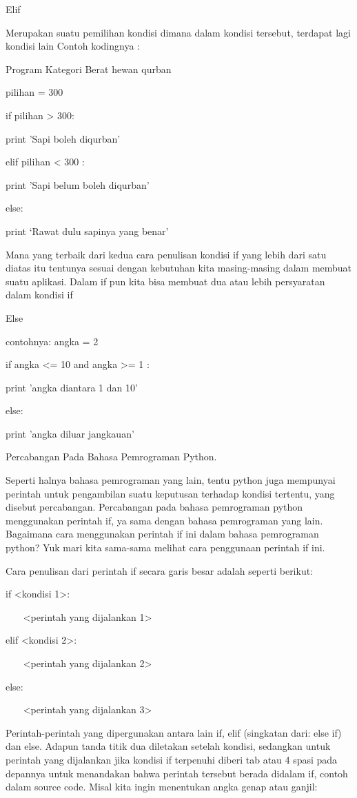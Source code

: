 Elif 
 

Merupakan suatu pemilihan kondisi dimana dalam kondisi tersebut, terdapat lagi kondisi lain
Contoh kodingnya : 
 

Program Kategori Berat hewan qurban 
 

pilihan = 300 
 

if pilihan > 300: 
 

        print 'Sapi boleh diqurban' 
 

elif pilihan <    300 : 
 

        print 'Sapi belum boleh diqurban' 
 

else: 
 

        print ‘Rawat dulu sapinya yang benar' 
 

Mana yang terbaik dari kedua cara penulisan kondisi if yang lebih dari satu diatas itu tentunya sesuai dengan kebutuhan kita masing-masing dalam membuat suatu aplikasi. Dalam if pun kita bisa membuat dua atau lebih persyaratan dalam kondisi if 
 


Else 
 

contohnya:
angka = 2 
 

if angka <= 10 and angka >= 1 : 
 

        print 'angka diantara 1 dan 10' 
 

else: 
 

        print 'angka diluar jangkauan' 

 
Percabangan Pada Bahasa Pemrograman Python. 

 
Seperti halnya bahasa pemrograman yang lain, tentu python juga mempunyai perintah untuk pengambilan suatu keputusan terhadap kondisi tertentu, yang disebut percabangan. Percabangan pada bahasa pemrograman python menggunakan perintah   if, ya sama dengan bahasa pemrograman yang lain. Bagaimana cara menggunakan perintah   if   ini dalam bahasa pemrograman python? Yuk mari kita sama-sama melihat cara penggunaan perintah   if   ini. 

 
Cara penulisan dari perintah if secara garis besar adalah seperti berikut: 
 
if <kondisi 1>: 

 
~~~ <perintah yang dijalankan 1> 

 
elif <kondisi 2>: 

 
~~~ <perintah yang dijalankan 2> 

 
else: 

 
~~~ <perintah yang dijalankan 3> 

 
Perintah-perintah yang dipergunakan antara lain   if,   elif   (singkatan dari:   else if) dan   else. Adapun tanda titik dua diletakan setelah kondisi, sedangkan untuk perintah yang dijalankan jika kondisi if terpenuhi diberi   tab   atau   4 spasi   pada depannya untuk menandakan bahwa perintah tersebut berada didalam if, contoh dalam source code. Misal kita ingin menentukan angka genap atau ganjil: 

